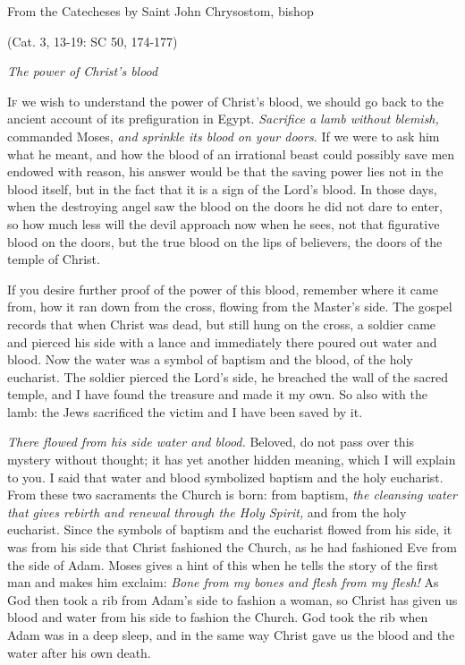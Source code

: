 \vspace{5pt}
\noindent From the Catecheses by Saint John Chrysostom, bishop

\par \hfill(Cat. 3, 13-19: SC 50, 174-177)

\begin{center}\textit{The power of Christ’s blood}\end{center}

\lettrine[lines=3,loversize=0.15]{I}{f} we wish to understand the power of Christ’s blood, we should go back to the ancient account of its prefiguration in Egypt. \textit{Sacrifice a lamb without blemish,} commanded Moses, \textit{and sprinkle its blood on your doors.} If we were to ask him what he meant, and how the blood of an irrational beast could possibly save men endowed with reason, his answer would be that the saving power lies not in the blood itself, but in the fact that it is a sign of the Lord’s blood. In those days, when the destroying angel saw the blood on the doors he did not dare to enter, so how much less will the devil approach now when he sees, not that figurative blood on the doors, but the true blood on the lips of believers, the doors of the temple of Christ.

If you desire further proof of the power of this blood, remember where it came from, how it ran down from the cross, flowing from the Master’s side. The gospel records that when Christ was dead, but still hung on the cross, a soldier came and pierced his side with a lance and immediately there poured out water and blood. Now the water was a symbol of baptism and the blood, of the holy eucharist. The soldier pierced the Lord’s side, he breached the wall of the sacred temple, and I have found the treasure and made it my own. So also with the lamb: the Jews sacrificed the victim and I have been saved by it.

\textit{There flowed from his side water and blood.} Beloved, do not pass over this mystery without thought; it has yet another hidden meaning, which I will explain to you. I said that water and blood symbolized baptism and the holy eucharist. From these two sacraments the Church is born: from baptism, \textit{the cleansing water that gives rebirth and renewal through the Holy Spirit,} and from the holy eucharist. Since the symbols of baptism and the eucharist flowed from his side, it was from his side that Christ fashioned the Church, as he had fashioned Eve from the side of Adam. Moses gives a hint of this when he tells the story of the first man and makes him exclaim: \textit{Bone from my bones and flesh from my flesh!} As God then took a rib from Adam’s side to fashion a woman, so Christ has given us blood and water from his side to fashion the Church. God took the rib when Adam was in a deep sleep, and in the same way Christ gave us the blood and the water after his own death.

